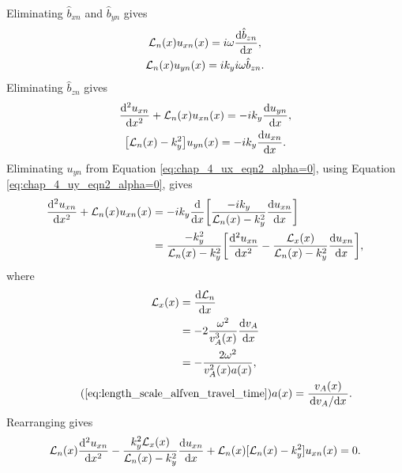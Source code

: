 Eliminating $\hat{b}_{xn}$ and $\hat{b}_{yn}$ gives
\begin{gather}
   \mathcal{L}_n(x)u_{xn}(x)=i\omega \dv{\hat{b}_{zn}}{x}, \\
   \label{eq:chap_4_uy_eqn_bz}
   \mathcal{L}_n(x)u_{yn}(x)=ik_y i\omega \hat{b}_{zn}.
\end{gather}
Eliminating $\hat{b}_{zn}$ gives
\begin{gather}
    \label{eq:chap_4_ux_eqn2_alpha=0}
    \dv[2]{u_{xn}}{x}+\mathcal{L}_n(x)u_{xn}(x)=-ik_y\dv{u_{yn}}{x},\\
    \label{eq:chap_4_uy_eqn2_alpha=0}
    \qty[\mathcal{L}_n(x)-k_y^2]u_{yn}(x)=-ik_y\dv{u_{xn}}{x}.
\end{gather}
Eliminating $u_{yn}$ from Equation \eqref{eq:chap_4_ux_eqn2_alpha=0}, using Equation \eqref{eq:chap_4_uy_eqn2_alpha=0}, gives
\[
    \begin{aligned}
    \dv[2]{u_{xn}}{x}+\mathcal{L}_n(x)u_{xn}(x)&=-ik_y\dv{}{x}\qty[\frac{-ik_y}{\mathcal{L}_n(x)-k_y^2}\dv{u_{xn}}{x}] \\
    &=\frac{-k_y^2}{\mathcal{L}_n(x)-k_y^2}\qty[\dv[2]{u_{xn}}{x}-\frac{\mathcal{L}_x(x)}{\mathcal{L}_n(x)-k_y^2}\dv{u_{xn}}{x}],
    \end{aligned}
\]
where
\begin{gather}
\begin{aligned}
    \mathcal{L}_x(x) &= \dv{\mathcal{L}_n}{x} \\
    &= -2\frac{\omega^2}{v_A^3(x)}\dv{v_A}{x} \\
    &= -\frac{2\omega^2}{v_A^2(x)a(x)},
\end{aligned} \\
    \tag{\ref{eq:length_scale_alfven_travel_time}}
    a(x) = \frac{v_A(x)}{\dv*{v_A}{x}}.
\end{gather}
Rearranging gives
\begin{equation}
    \label{eq:uxn_ode1}
    \mathcal{L}_n(x)\dv[2]{u_{xn}}{x}-\frac{k_y^2\mathcal{L}_x(x)}{\mathcal{L}_n(x)-k_y^2}\dv{u_{xn}}{x}+\mathcal{L}_n(x)[\mathcal{L}_n(x)-k_y^2]u_{xn}(x)=0.
\end{equation}


